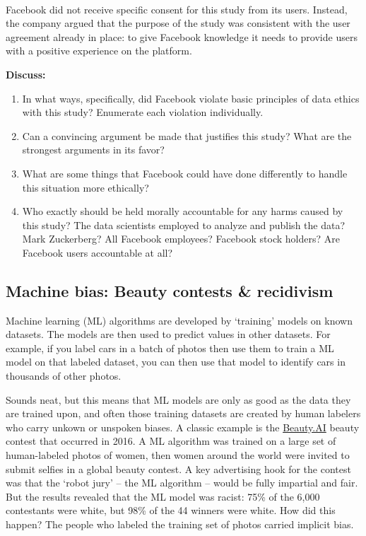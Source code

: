 \documentclass[
]{book}
\begin{document}
~

Facebook did not receive specific consent for this study from its users. Instead, the company argued that the purpose of the study was consistent with the user agreement already in place: to give Facebook knowledge it needs to provide users with a positive experience on the platform.

\textbf{Discuss:}

\begin{enumerate}
\def\labelenumi{\arabic{enumi}.}
\item
  In what ways, specifically, did Facebook violate basic principles of data ethics with this study? Enumerate each violation individually.
\item
  Can a convincing argument be made that justifies this study? What are the strongest arguments in its favor?
\item
  What are some things that Facebook could have done differently to handle this situation more ethically?
\item
  Who exactly should be held morally accountable for any harms caused by this study? The data scientists employed to analyze and publish the data? Mark Zuckerberg? All Facebook employees? Facebook stock holders? Are Facebook users accountable at all?
\end{enumerate}

\hypertarget{machine-bias-beauty-contests-recidivism}{%
\subsection*{Machine bias: Beauty contests \& recidivism}\label{machine-bias-beauty-contests-recidivism}}

Machine learning (ML) algorithms are developed by `training' models on known datasets. The models are then used to predict values in other datasets. For example, if you label cars in a batch of photos then use them to train a ML model on that labeled dataset, you can then use that model to identify cars in thousands of other photos.

Sounds neat, but this means that ML models are only as good as the data they are trained upon, and often those training datasets are created by human labelers who carry unkown or unspoken biases. A classic example is the \href{https://www.theguardian.com/technology/2016/sep/08/artificial-intelligence-beauty-contest-doesnt-like-black-people}{Beauty.AI} beauty contest that occurred in 2016. A ML algorithm was trained on a large set of human-labeled photos of women, then women around the world were invited to submit selfies in a global beauty contest. A key advertising hook for the contest was that the `robot jury' -- the ML algorithm -- would be fully impartial and fair. But the results revealed that the ML model was racist: 75\% of the 6,000 contestants were white, but 98\% of the 44 winners were white. How did this happen? The people who labeled the training set of photos carried implicit bias.
\end{document}
